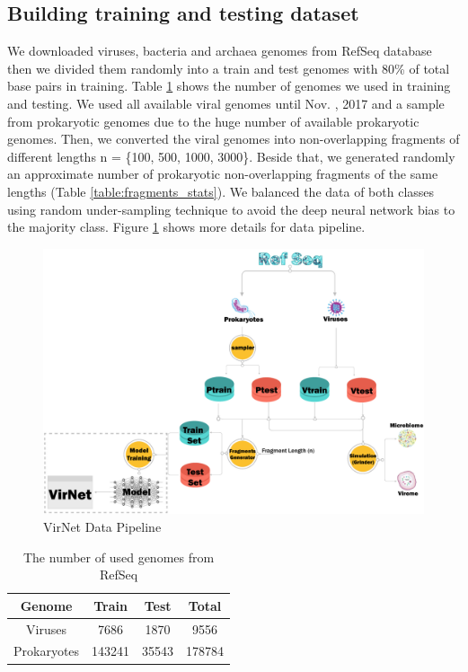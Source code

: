 \documentclass[conference]{IEEEtran}
\begin{document}
\subsection{Building training and testing dataset}
We downloaded viruses, bacteria and archaea genomes from RefSeq database then we divided them randomly into a train and test genomes with 80\% of total base pairs in training. Table \ref{table:genome_stats} shows the number of genomes we used in training and testing. We used all available viral genomes until Nov. , 2017 and a sample from prokaryotic genomes due to the huge number of available prokaryotic genomes. Then, we converted the viral genomes into non-overlapping fragments of different lengths n = \{100, 500, 1000, 3000\}. Beside that, we generated randomly an approximate number of prokaryotic non-overlapping fragments of the same lengths (Table \ref{table:fragments_stats}). We balanced the data of both classes using random under-sampling technique to avoid the deep neural network bias to the majority class. Figure \ref{fig:data_pipline} shows more details for data pipeline.

\begin{figure}
	\centering
	\includegraphics[width=\columnwidth]{imgs/data_pipeline.PNG}
	\caption{VirNet Data Pipeline}
	\label{fig:data_pipline}
\end{figure}

\begin{table}[h!]
	\centering
	\begin{tabular}{||c c c c||} 
		Genome & Train & Test & Total \\ [0.5ex] 
		\hline\hline
		Viruses & 7686  & 1870 & 9556 \\ 
		Prokaryotes & 143241  & 35543 & 178784  \\ [1ex] 
	\end{tabular}
	\caption{The number of used genomes from RefSeq}
	\label{table:genome_stats}
\end{table}
\end{document}
